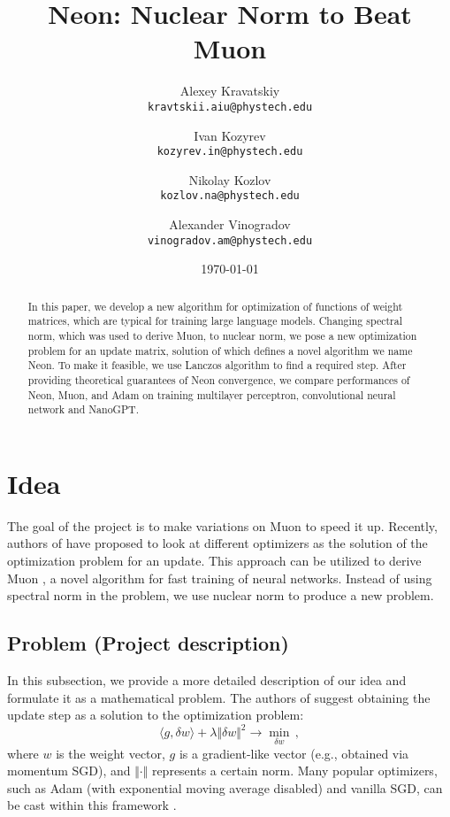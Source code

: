 \documentclass[]{scrartcl}
\title{Neon: Nuclear Norm to Beat Muon}
\author{
  Alexey Kravatskiy\\
  \texttt{kravtskii.aiu@phystech.edu}
  \and
  Ivan Kozyrev\\
  \texttt{kozyrev.in@phystech.edu}
  \and
  Nikolay Kozlov \\
  \texttt{kozlov.na@phystech.edu}
  \and
  Alexander Vinogradov \\
  \texttt{vinogradov.am@phystech.edu}
}
\date{\today}
\newcommand{\norm}[1]{\Vert{#1}\Vert}
\begin{document}
\maketitle

\begin{abstract}
In this paper, we develop a new algorithm for optimization of functions of weight matrices, which are typical for training large language models. Changing spectral norm, which was used to derive Muon, to nuclear norm, we pose a new optimization problem for an update matrix, solution of which defines a novel algorithm we name Neon. To make it feasible, we use Lanczos algorithm to find a required step. After providing theoretical guarantees of Neon convergence, we compare performances of Neon, Muon, and Adam on training multilayer perceptron, convolutional neural network and NanoGPT.

\end{abstract}

\section{Idea}
The goal of the project is to make variations on Muon to speed it up. Recently, authors of \cite{bernstein2024oldoptimizernewnorm} have proposed to look at different optimizers as the solution of the optimization problem for an update. This approach can be utilized to derive Muon \cite{jordan2024muon}, a novel algorithm for fast training of neural networks. Instead of using spectral norm in the problem, we use nuclear norm to produce a new problem. %

\subsection{Problem (Project description)}

In this subsection, we provide a more detailed description of our idea and formulate it as a mathematical problem. The authors of \cite{bernstein2024oldoptimizernewnorm} suggest obtaining the update step as a solution to the optimization problem:
\begin{equation}
    \langle g, \delta w \rangle + \lambda \norm{\delta w}^2 \to \min_{\delta w}\,,
\end{equation}
where $w$ is the weight vector, $g$ is a gradient-like vector (e.g., obtained via momentum SGD), and $\norm{\cdot}$ represents a certain norm. Many popular optimizers, such as Adam (with exponential moving average disabled) and vanilla SGD, can be cast within this framework \cite{bernstein2024oldoptimizernewnorm}.
\end{document}
